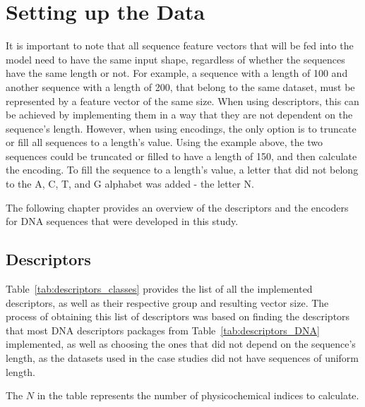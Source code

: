 \section{Setting up the Data}\label{sec:setup}

It is important to note that all sequence feature vectors that will be fed into the model need to have the same input shape, regardless of whether the sequences have the same length or not. For example, a sequence with a length of 100 and another sequence with a length of 200, that belong to the same dataset, must be represented by a feature vector of the same size. When using descriptors, this can be achieved by implementing them in a way that they are not dependent on the sequence's length. However, when using encodings, the only option is to truncate or fill all sequences to a length's value. Using the example above, the two sequences could be truncated or filled to have a length of 150, and then calculate the encoding. To fill the sequence to a length's value, a letter that did not belong to the \gls{A}, \gls{C}, \gls{T}, and \gls{G} alphabet was added - the letter N. 

The following chapter provides an overview of the descriptors and the encoders for \gls{DNA} sequences that were developed in this study.

\subsection{Descriptors}\label{cha:descriptors}

Table~\ref{tab:descriptors_classes} provides the list of all the implemented descriptors, as well as their respective group and resulting vector size. The process of obtaining this list of descriptors was based on finding the descriptors that most \gls{DNA} descriptors packages from Table~\ref{tab:descriptors_DNA} implemented, as well as choosing the ones that did not depend on the sequence's length, as the datasets used in the case studies did not have sequences of uniform length.

The $N$ in the table represents the number of physicochemical indices to calculate.


